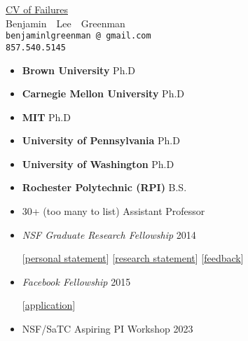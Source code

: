 \documentclass{article}
\makeatletter
\renewcommand{\maketitle}{
\begin{center}
  {\large{\href{https://www.princeton.edu/~joha/Johannes\_Haushofer\_CV\_of\_Failures.pdf}{CV of Failures}} \\
   \large{Benjamin~~Lee~~Greenman}}
\\\texttt{benjaminlgreenman\,@\,gmail.com}
\\\texttt{857.540.5145}
\end{center}
}
\makeatother
\begin{document}
\maketitle

{\centering{}}



\begin{itemize}
\item {\bf Brown University} \hfill Ph.D
\item {\bf Carnegie Mellon University} \hfill Ph.D
\item {\bf MIT} \hfill Ph.D
\item {\bf University of Pennsylvania} \hfill Ph.D
\item {\bf University of Washington} \hfill Ph.D
\item {\bf Rochester Polytechnic (RPI)} \hfill B.S.
\end{itemize}


\begin{itemize}
  \item 30+ (too many to list)  \hfill Assistant Professor
\end{itemize}


\begin{itemize}
\item \emph{NSF Graduate Research Fellowship} \hfill 2014
\item[] [\href{https://cs.brown.edu/~bgreenma/cv/failures/nsf-2014-personal-reject.pdf}{personal statement}]
        [\href{https://cs.brown.edu/~bgreenma/cv/failures/nsf-2014-research-reject.pdf}{research statement}]
        [\href{https://cs.brown.edu/~bgreenma/cv/failures/nsf-2014-reject-response.pdf}{feedback}]
\item \emph{Facebook Fellowship} \hfill 2015
\item[] [\href{http://ccs.neu.edu/home/types/cv/failures/facebook-2015-reject.pdf}{application}]
\item NSF/SaTC Aspiring PI Workshop \hfill 2023
\end{itemize}
\end{document}
